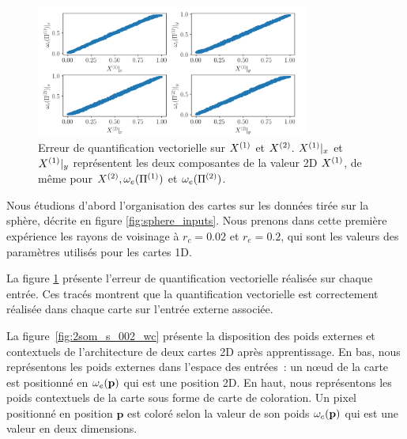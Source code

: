 \documentclass[../main]{subfiles}
\begin{document}
\begin{figure}[h]
	\centering\includegraphics[width=0.8\textwidth]{error-2SOM.png}
	\caption{Erreur de quantification vectorielle sur $X^{({1})}$ et $X^{({2})}$. $X^{({1})}|_x$ et $X^{({1})}|_y$ représentent les deux composantes de la valeur 2D $X^{({1})}$, de même pour $X^{({2})}, \omega_e(\Pi^{({1})})$ et  $\omega_e(\Pi^{({2})})$. \label{fig:err_2D}}
\end{figure}

Nous étudions d'abord l'organisation des cartes sur les données tirée sur la sphère, décrite en figure \ref{fig:sphere_inputs}. 
Nous prenons dans cette première expérience les rayons de voisinage à $r_c = 0.02$ et $r_e = 0.2$, qui sont les valeurs des paramètres utilisés pour les cartes 1D.

La figure \ref{fig:err_2D} présente l'erreur de quantification vectorielle réalisée sur chaque entrée. Ces tracés montrent que la quantification vectorielle est correctement réalisée dans chaque carte sur l'entrée externe associée.

La figure~\ref{fig:2som_s_002_wc} présente la disposition des poids externes et contextuels de l'architecture de deux cartes 2D après apprentissage.
En bas, nous représentons les poids externes dans l'espace des entrées~: un n\oe{}ud de la carte est positionné en $\omega_e(\mathbf{p})$ qui est une position 2D.
En haut, nous représentons les poids contextuels de la carte sous forme de carte de coloration. Un pixel positionné en position $\mathbf{p}$ est coloré selon la valeur de son poids $\omega_c(\mathbf{p})$ qui est une valeur en deux dimensions.
\end{document}
